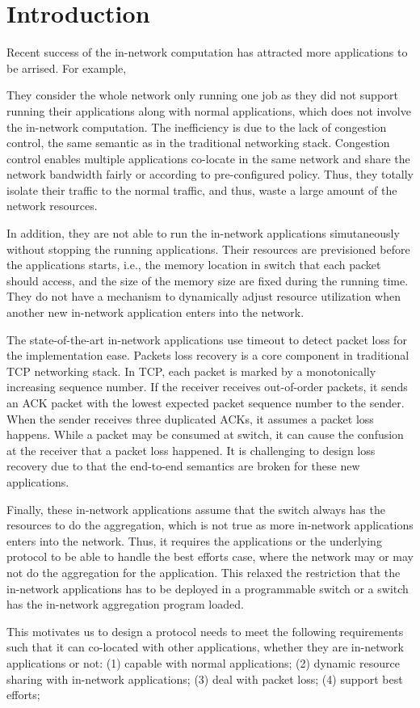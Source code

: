 \section{Introduction}
Recent success of the in-network computation has attracted more 
applications to be arrised. For example, 


They consider the whole network only running one job
as they did not support running their applications along with normal applications, 
which does not involve the in-network computation.
The inefficiency is due to the lack of congestion control, the same semantic 
as in the traditional networking stack.
Congestion control enables multiple applications co-locate in the same network and share the network
bandwidth fairly or according to pre-configured policy.
Thus, they totally isolate their traffic to the normal traffic, and thus, waste
a large amount of the network resources. 

In addition, they are not able to run the in-network applications simutaneously without stopping the running applications.
Their resources are previsioned before the applications starts, i.e., 
the memory location in switch that each packet should access, and the
size of the memory size are fixed during the running time.
They do not have a mechanism to dynamically adjust resource utilization 
when another new in-network application enters into the network.


The state-of-the-art in-network applications use timeout to detect packet loss for the implementation ease.  
Packets loss recovery is a core component in
traditional TCP networking stack.
In TCP, each packet is marked by a monotonically increasing sequence number. 
If the receiver receives out-of-order packets, it sends an ACK packet with the lowest 
expected packet sequence number to the sender. 
When the sender receives three duplicated ACKs, it assumes a packet loss happens.
While a packet may be consumed at switch, it can cause the confusion at the receiver
that a packet loss happened. It is challenging to design loss recovery due to that the end-to-end semantics are broken 
for these new applications.
 
Finally, these in-network applications assume that the switch always has the resources to do the aggregation,
which is not true as more in-network applications enters into the network. Thus, it requires the applications or
the underlying protocol to be able to handle the best efforts case, where the network may or may not do the 
aggregation for the application. This relaxed the restriction that the in-network applications has to be deployed 
in a programmable switch or a switch has the in-network aggregation program loaded.   

This motivates us to design a protocol needs to meet the following requirements such that it can co-located with other 
applications, whether they are in-network applications or not:
(1) capable with normal applications; (2) dynamic resource sharing with in-network applications;
(3) deal with packet loss; (4) support best efforts;
